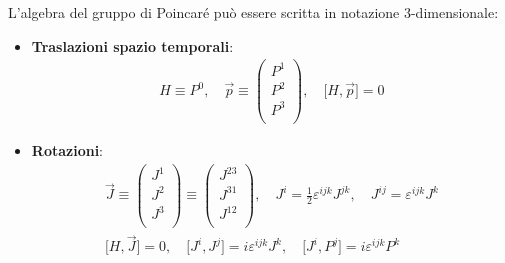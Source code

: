\documentclass[../main.tex]{subfiles}
\begin{document}
\begin{nota}
    L'algebra del gruppo di Poincaré può essere scritta in notazione 3-dimensionale:
    \begin{itemize}
        \item \textbf{Traslazioni spazio temporali}:
        \[
        \boxed{
        \begin{aligned}
            H\equiv P^0, \quad \Vec{p} \equiv 
            \begin{pmatrix}
            P^1\\
            P^2\\
            P^3\\
            \end{pmatrix}, \quad \big[ H, \Vec{p} \big] = 0
        \end{aligned}}
        \]
        
        \item \textbf{Rotazioni}:
        \[
        \boxed{
        \begin{aligned}
            \Vec{J} \equiv 
            \begin{pmatrix}
            J^1\\
            J^2\\
            J^3\\
            \end{pmatrix}\equiv 
            \begin{pmatrix}
            J^{23}\\
            J^{31}\\
            J^{12}\\
            \end{pmatrix}, \quad 
            J^i = \frac{1}{2}\varepsilon^{ijk}J^{jk}, \quad J^{ij} = \varepsilon^{ijk}J^k\\
            \big[ H, \Vec{J} \big] = 0, \quad \big[ J^{i}, J^{j} \big] = i\varepsilon^{ijk}J^k, \quad \big[ J^{i}, P^{j} \big] = i\varepsilon^{ijk}P^k
        \end{aligned}}
        \]
        

\end{itemize}
\end{nota}
\end{document}
